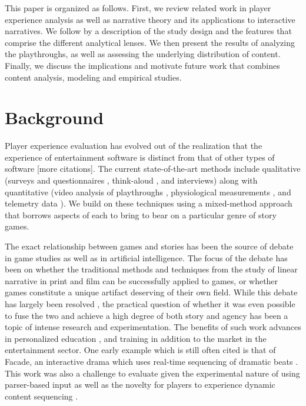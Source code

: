 This paper is organized as follows. First, we review related work in
player experience analysis as well as narrative theory and its
applications to interactive narratives. We follow by a description of
the study design and the features that comprise the different
analytical lenses. We then present the results of analyzing the
playthroughs, as well as assessing the underlying distribution of
content. Finally, we discuss the implications and motivate future work
that combines content analysis, modeling and empirical studies.

\section{Background}
\label{sec:org7de9e30}
Player experience evaluation has evolved out of the realization that
the experience of entertainment software is distinct from that of
other types of software \cite{Sanchez2012-cz} [more citations]. The
current state-of-the-art methods include qualitative (surveys and
questionnaires \cite{Qin2009-xm}, think-aloud \cite{Tan2014-xr}, and
interviews) along with quantitative (video analysis of playthroughs
\cite{Marczak2012-bs}, physiological measurements
\cite{Mandryk2006-sd}, and telemetry data \cite{Drachen2015-hn}). We
build on these techniques using a mixed-method approach that borrows
aspects of each to bring to bear on a particular genre of story games.

The exact relationship between games and stories has been the source
of debate in game studies as well as in artificial intelligence. The
focus of the debate has been on whether the traditional methods and
techniques from the study of linear narrative in print and film can be
successfully applied to games, or whether games constitute a unique
artifact deserving of their own field. While this debate has largely
been resolved \cite{Aarseth2012-ol}, the practical question of whether
it was even possible to fuse the two and achieve a high degree of both
story and agency has been a topic of intense research and
experimentation. The benefits of such work advances in personalized
education \cite{Rowe_undated-cl}, and training in addition to the
market in the entertainment sector. One early example which is still
often cited is that of Facade, an interactive drama which uses
real-time sequencing of dramatic beats \cite{Mateas2003-ty}. This work
was also a challenge to evaluate given the experimental nature of
using parser-based input as well as the novelty for players to
experience dynamic content sequencing
\cite{Mehta2007-gn,Seif_El-Nasr2013-hp}.


